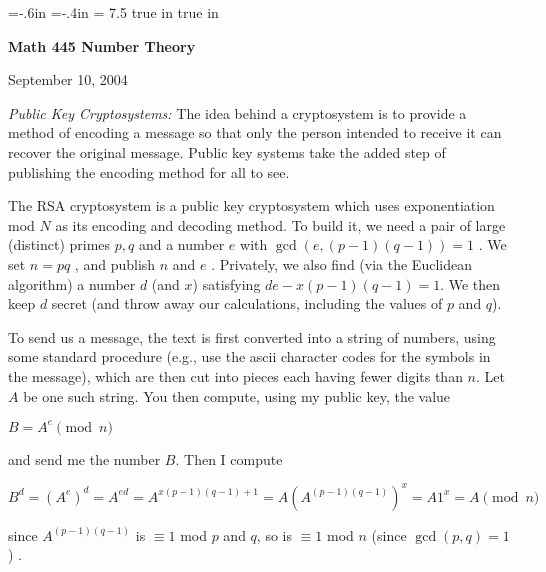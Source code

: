 
%





\nopagenumbers
\parindent=-15pt
\voffset=-.6in
\hoffset=-.4in
\hsize = 7.5 true in
 true in
\overfullrule=0pt


\def\ctln{\centerline}
\def\u{\underbar}
\def\ssk{\smallskip}
\def\msk{\medskip}
\def\bsk{\bigskip}


\ctln{\bf Math 445 Number Theory}

\medskip

\ctln{September 10, 2004}

\bigskip

{\it Public Key Cryptosystems:} The idea behind a cryptosystem is to provide a
method of encoding a message so that only the person intended to receive it
can recover the original message. Public key systems take the added step
of publishing the encoding method for all to see.

\msk

The RSA cryptosystem is a public key cryptosystem which uses exponentiation
mod $N$ as its encoding and decoding method. To build it, we need a pair
of large (distinct) primes $p,q$ and a number $e$ with $\gcd(e,(p-1)(q-1))=1$ . We
set $n=pq$ , and publish $n$ and $e$ . Privately, we also find (via the Euclidean
algorithm) a number $d$ (and $x$) satisfying $de-x(p-1)(q-1) = 1$. We then keep 
$d$ secret (and throw away our calculations, including the values of $p$ and $q$).

\msk

To send us a message, the text is first converted into a string of numbers, using some
standard procedure (e.g., use the ascii character codes for the symbols in the message), 
which are then cut into pieces each having fewer digits than $n$. Let $A$ be one such string.
You then compute, using my public key, the value

\ssk

\ctln{$B=A^e\pmod{n}$} 

\ssk

\noindent and send me the number $B$. Then I compute

\ssk

\ctln{$B^d = (A^e)^d = A^{ed} = A^{x(p-1)(q-1)+1} = A(A^{(p-1)(q-1)})^x = A1^x = A\pmod{n}$}

\noindent since $A^{(p-1)(q-1)}$ is $\equiv 1$ mod $p$ and $q$, so is $\equiv 1$ mod $n$ (since $\gcd(p,q)=1$) .

\medskip

